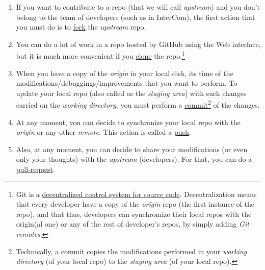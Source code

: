 \begin{enumerate}
\item If you want to contribute to a repo (that we will call
  \emph{upstream}) and you don't belong to the team of developers
  (such as in InterCom), the first action that you must do is to
  \href{https://docs.github.com/en/github/getting-started-with-github/fork-a-repo}{fork}
  the \emph{upstream} repo.
\item You can do a lot of work in a repo hosted by GitHub using the Web
  interface, but it is much more convenient if you
  \href{https://docs.github.com/en/github/creating-cloning-and-archiving-repositories/cloning-a-repository}{clone}
  the repo.\footnote{Git is a
  \href{https://nvie.com/posts/a-successful-git-branching-model/}{decentralized
    control system for source code}. Decentralization means that every
  developer have a copy of the \emph{origin} repo (the first instance
  of the repo), and that thus, developers can synchromize their local
  repos with the origin(al one) or any of the rest of developer's
  repos, by simply adding \emph{Git remotes}.}
\item When you have a copy of the \emph{origin} in your local disk,
  its time of the modifications/debuggings/improvements that you want
  to perform. To update your local repo (also called as the
  \emph{staging area}) with such changes carried on the \emph{working
  directory}, you must perform a
  \href{https://docs.github.com/en/github/getting-started-with-github/github-glossary#commit}{commit}\footnote{Technically,
  a commit copies the modifications performed in your \emph{working
  directory} (of your local repo) to the \emph{staging area} (of your
  local repo).} of the changes.
\item At any moment, you can decide to synchronize your local repo
  with the \emph{origin} or any other \emph{remote}. This action is
  called a
  \href{https://docs.github.com/en/github/using-git/pushing-commits-to-a-remote-repository}{push}.
\item Also, at any moment, you can decide to share your modifications
  (or even only your thoughts) with the \emph{upstream}
  (developers). For that, you can do a
  \href{https://docs.github.com/en/github/collaborating-with-issues-and-pull-requests/about-pull-requests}{pull-request}.
\end{enumerate}

